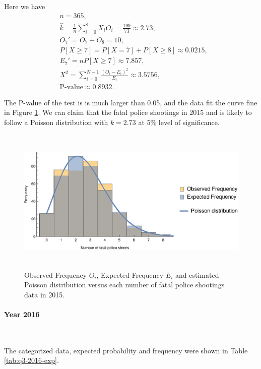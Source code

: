 \documentclass[conf]{new-aiaa}
\begin{document}
Here we have
\begin{align*}
&n=365,\\
&\hat{k} = \frac{1}{n}\sum_{i=0}^{8} X_iO_i = \frac{199}{73} \approx 2.73,\\
&O_7'=O_7+O_8=10,\\
&P[X\geqslant7]=P[X=7]+P[X\geqslant8]\approx 0.0215,\\
&E_7'=nP[X\geqslant7]\approx7.857,\\
&X^2=\sum_{i=0}^{N-1}\frac{(O_i-E_i)^2}{E_i}\approx3.5756,\\
&\text{P-value}\approx0.8932.
\end{align*}

The P-value of the test is is much larger than 0.05, and the data fit the curve fine in Figure \ref{fig:q3-2015-exp}. We can claim that the fatal police shootings in 2015 and is likely to follow a Poisson distribution with $k=2.73$ at 5\% level of significance.

\begin{figure}[!htbp]
\centering
\includegraphics[height=7cm]{q3/q3-2015-exp.eps}
\caption{Observed Frequency $O_i$, Expected Frequency $E_i$ and estimated Poisson distribution versus each number of fatal police shootings data in 2015.}
\label{fig:q3-2015-exp}
\end{figure}

\paragraph{Year 2016}\ 

The categorized data, expected probability and frequency were shown in Table \ref{tab:q3-2016-exp}. \medskip
\end{document}
